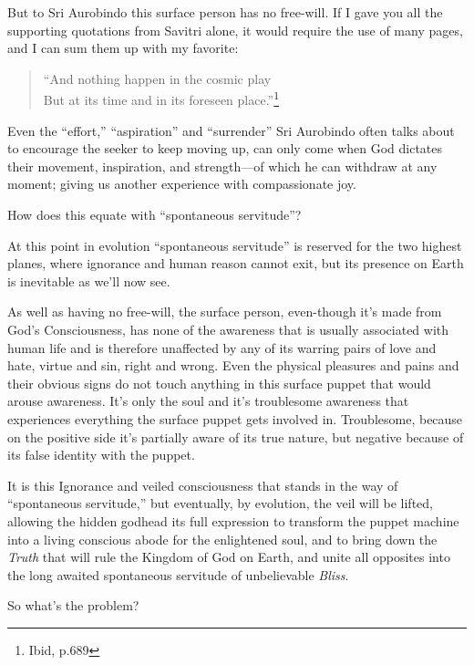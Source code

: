 \documentclass[12pt,a4paper]{book}
\begin{document}
But to Sri Aurobindo this surface person has no free-will. If I gave
you all the supporting quotations from Savitri alone, it would require
the use of many pages, and I can sum them up with my favorite:

\begin{verse}
``And nothing happen in the cosmic play\\
But at its time and in its foreseen place.''\footnote{Ibid, p.689}
\end{verse}

Even the ``effort,'' ``aspiration'' and ``surrender'' Sri Aurobindo
often talks about to encourage the seeker to keep moving up, can only
come when God dictates their movement, inspiration, and strength---of
which he can withdraw at any moment; giving us another experience with
compassionate joy.

How does this equate with ``spontaneous servitude''?

At this point in evolution ``spontaneous servitude'' is reserved for
the two highest planes, where ignorance and human reason cannot exit,
but its presence on Earth is inevitable as we'll now see.

As well as having no free-will, the surface person, even-though it's
made from God's Consciousness, has none of the awareness that is
usually associated with human life and is therefore unaffected by any
of its warring pairs of love and hate, virtue and sin, right and
wrong. Even the physical pleasures and pains and their obvious signs
do not touch anything in this surface puppet that would arouse
awareness. It's only the soul and it's troublesome awareness that
experiences everything the surface puppet gets involved
in. Troublesome, because on the positive side it's partially aware of
its true nature, but negative because of its false identity with the
puppet.

It is this Ignorance and veiled consciousness that stands in the way
of ``spontaneous servitude,'' but eventually, by evolution, the veil
will be lifted, allowing the hidden godhead its full expression to
transform the puppet machine into a living conscious abode for the
enlightened soul, and to bring down the \emph{Truth} that will rule
the Kingdom of God on Earth, and unite all opposites into the long
awaited spontaneous servitude of unbelievable \emph{Bliss}.

\noindent So what's the problem?
\end{document}
